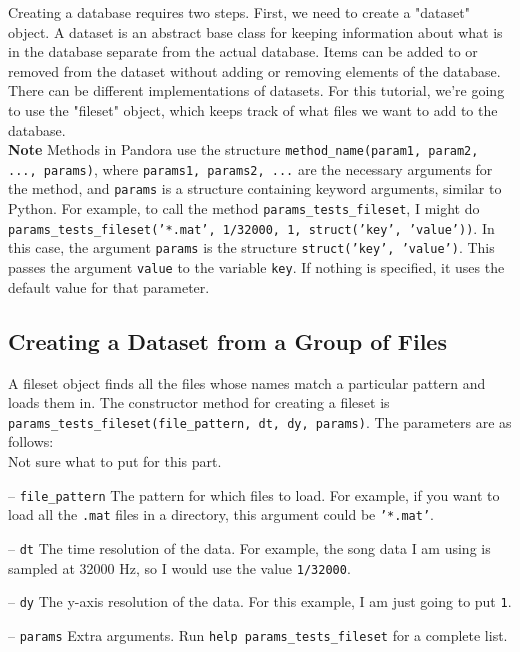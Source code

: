 \documentclass{article}
\let\oldmarginpar\marginpar
\renewcommand\marginpar[1]{\-\oldmarginpar[\raggedleft #1]%
{\raggedright #1}}
\newenvironment{checklist}{%
  \begin{list}{}{}%
  \let\olditem\item
  \renewcommand\item{\olditem -- \marginpar{$\Box$} }
  \newcommand\checkeditem{\olditem -- \marginpar{$\CheckedBox$} }
}{%
  \end{list}
}
\begin{document}
Creating a database requires two steps. First, we need to create a "dataset" object. A dataset is an abstract base class for keeping information about what is in the database separate from the actual database. Items can be added to or removed from the dataset without adding or removing elements of the database.\\

There can be different implementations of datasets. For this tutorial, we're going to use the "fileset" object, which keeps track of what files we want to add to the database.\\

\textbf{Note} Methods in Pandora use the structure \texttt{method\_name(param1, param2, ..., params)}, where \texttt{params1, params2, ...} are the necessary arguments for the method, and \texttt{params} is a structure containing keyword arguments, similar to Python. For example, to call the method \texttt{params\_tests\_fileset}, I might do \texttt{params\_tests\_fileset('*.mat', 1/32000, 1, struct('key', 'value'))}. In this case, the argument \texttt{params} is the structure \texttt{struct('key', 'value')}. This passes the argument \texttt{value} to the variable \texttt{key}. If nothing is specified, it uses the default value for that parameter.

\subsection{Creating a Dataset from a Group of Files}

A fileset object finds all the files whose names match a particular pattern and loads them in. The constructor method for creating a fileset is \texttt{params\_tests\_fileset(file\_pattern, dt, dy, params)}. The parameters are as follows:\\

Not sure what to put for this part.

\begin{checklist}
	\item		\texttt{file\_pattern} The pattern for which files to load. For example, if you want to load all the \texttt{.mat} files in a directory, this argument could be \texttt{'*.mat'}.
	\item		\texttt{dt} The time resolution of the data. For example, the song data I am using is sampled at 32000 Hz, so I would use the value \texttt{1/32000}.
	\item		\texttt{dy} The y-axis resolution of the data. For this example, I am just going to put \texttt{1}.
	\item		\texttt{params} Extra arguments. Run \texttt{help params\_tests\_fileset} for a complete list.
\end{checklist}
\end{document}
